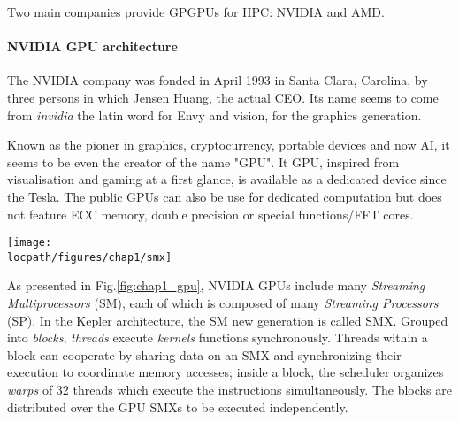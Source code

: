 Two main companies provide GPGPUs for  HPC: NVIDIA and AMD.

\paragraph{NVIDIA GPU architecture}

The NVIDIA company was fonded in April 1993 in Santa Clara, Carolina, by three persons in which Jensen Huang, the actual CEO.
Its name seems to come from \textit{invidia} the latin word for Envy and vision, for the graphics generation. 

Known as the pioner in graphics, cryptocurrency, portable devices and now AI, it seems to be even the creator of the name "GPU".
It GPU, inspired from visualisation and gaming at a first glance, is available as a dedicated device  since the Tesla. 
The public GPUs can also be use for dedicated computation but does not feature ECC memory, double precision or special functions/FFT cores. 

\begin{figure*}[t!]
\centering
\setlength\fboxsep{0pt}
\setlength\fboxrule{0.25pt}
\texttt{[image: \\locpath/figures/chap1/smx]}
\caption{NVIDIA GPU and CUDA architecture overview}
 \label{fig:chap1_gpu}
\end{figure*}

As presented in Fig.\ref{fig:chap1_gpu}, NVIDIA GPUs include many \emph{Streaming Multiprocessors} (SM), each of which is composed of many \emph{Streaming Processors} (SP). In the Kepler architecture, the SM new generation is called SMX.
%
Grouped into \emph{blocks}, \textit{threads} execute \emph{kernels} functions synchronously.
Threads within a block can cooperate by sharing data on an SMX and synchronizing their execution to coordinate memory accesses; inside a block, the scheduler organizes \emph{warps} of 32 threads which execute the instructions simultaneously.
The blocks are distributed over the GPU SMXs to be executed independently.


